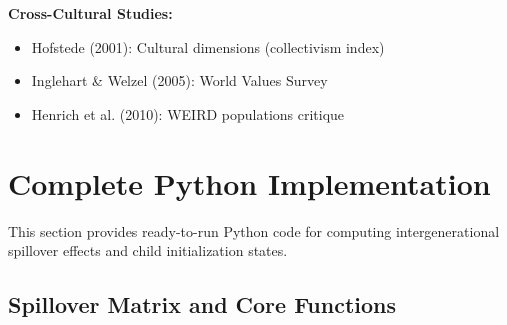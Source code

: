 \textbf{Cross-Cultural Studies:}
\begin{itemize}[nosep]
    \item Hofstede (2001): Cultural dimensions (collectivism index)
    \item Inglehart \& Welzel (2005): World Values Survey
    \item Henrich et al. (2010): WEIRD populations critique
\end{itemize}


\section{Complete Python Implementation}
\label{sec:BI-python}

\begin{tcolorbox}[colback=blue!5!white, colframe=blue!75!black, title=Purpose]
This section provides ready-to-run Python code for computing intergenerational
spillover effects and child initialization states.
\end{tcolorbox}

\subsection{Spillover Matrix and Core Functions}

